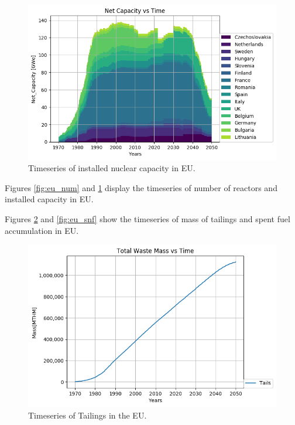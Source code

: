 \begin{figure}[htbp!]
	\begin{center}
		\includegraphics[width=\columnwidth]{./images/eu_future/power_plot.png}
	\end{center}
	\caption{Timeseries of installed nuclear capacity in \gls{EU}.}
	\label{fig:eu_pow}
\end{figure}

Figures \ref{fig:eu_num} and \ref{fig:eu_pow} display the
timeseries of number of reactors and installed capacity in \gls{EU}.

Figures \ref{fig:eu_tail} and \ref{fig:eu_snf} show the 
timeseries of mass of tailings and spent fuel accumulation in \gls{EU}.

\begin{figure}[htbp!]
	\begin{center}
		\includegraphics[width=\columnwidth]{./images/eu_future/tailings.png}
	\end{center}
	\caption{Timeseries of Tailings in the \gls{EU}.}
	\label{fig:eu_tail}
\end{figure}



